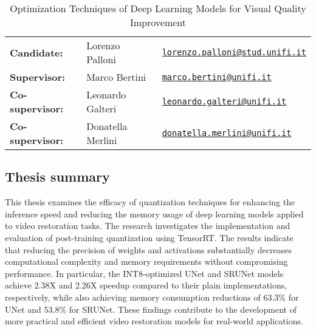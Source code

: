 \documentclass{article}
\begin{document}
\begin{table}
\centering
\caption*{Optimization Techniques of Deep Learning Models for Visual Quality Improvement}
\begin{tabular}{lll}
\textbf{Candidate:}   & Lorenzo Palloni & \href{mailto:lorenzo.palloni@stud.unifi.it}{\texttt{lorenzo.palloni@stud.unifi.it}} \\
\textbf{Supervisor:}    & Marco Bertini & \href{mailto:marco.bertini@unifi.it}{\texttt{marco.bertini@unifi.it}} \\
\textbf{Co-supervisor:}    & Leonardo Galteri & \href{mailto:leonardo.galteri@unifi.it}{\texttt{leonardo.galteri@unifi.it}} \\
\textbf{Co-supervisor:}    & Donatella Merlini & \href{mailto:donatella.merlini@unifi.it}{\texttt{donatella.merlini@unifi.it}} \\

\end{tabular}
\end{table}
\subsection*{Thesis summary}

This thesis examines the efficacy of quantization techniques for enhancing the inference speed and reducing the memory usage of deep learning models applied to video restoration tasks. The research investigates the implementation and evaluation of post-training quantization using TensorRT. The results indicate that reducing the precision of weights and activations substantially decreases computational complexity and memory requirements without compromising performance. In particular, the INT8-optimized UNet and SRUNet models achieve 2.38X and 2.26X speedup compared to their plain implementations, respectively, while also achieving memory consumption reductions of 63.3\% for UNet and 53.8\% for SRUNet. These findings contribute to the development of more practical and efficient video restoration models for real-world applications.
\end{document}
